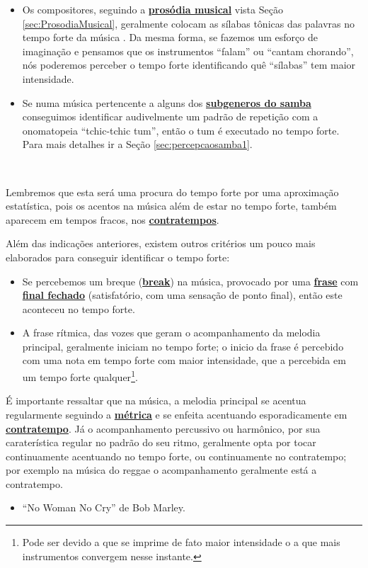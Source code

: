 \begin{itemize}
\item Os compositores, seguindo a \hyperref[sec:ProsodiaMusical]{\textbf{prosódia musical}} vista Seção \ref{sec:ProsodiaMusical}, 
geralmente colocam as sílabas tônicas das palavras no tempo forte da música  \cite[pp. 149]{medteoria}. 
Da mesma forma, se fazemos um esforço de imaginação e pensamos que os instrumentos ``falam'' ou ``cantam chorando'',
nós poderemos perceber o tempo forte identificando quê ``sílabas'' tem maior intensidade.
\item Se numa música pertencente a alguns dos \hyperref[sec:FamiliaSamba]{\textbf{subgeneros do samba}} 
conseguimos identificar audivelmente  um padrão de repetição com a onomatopeia ``tchic-tchic tum'', 
então o tum é executado no tempo forte. 
Para mais detalhes ir a Seção \ref{sec:percepcaosamba1}.
\end{itemize}~

Lembremos que esta será uma procura do tempo forte por uma aproximação estatística, 
pois os acentos na música além de estar no tempo forte, 
também aparecem em tempos fracos, nos \hyperref[sec:contratempo]{\textbf{contratempos}}.




Além das indicações anteriores, 
existem outros critérios um pouco mais elaborados para conseguir identificar o tempo forte:
\begin{itemize}
\item Se percebemos um breque (\hyperref[def:breakingoff]{\textbf{break}}) na música, 
provocado por uma \hyperref[sec:Frase]{\textbf{frase}} com \hyperref[subsec:FinalAbertoFechado]{\textbf{final fechado}} 
(satisfatório, com uma sensação de ponto final), então este aconteceu no tempo forte.
\item A frase rítmica, das vozes que geram o acompanhamento da melodia principal,
geralmente iniciam no tempo forte; 
o inicio da frase é percebido com uma nota em tempo forte com maior intensidade, 
que a percebida em um tempo forte qualquer\footnote{Pode ser
devido a que se imprime de fato maior intensidade o a que mais instrumentos convergem nesse instante.}.
\end{itemize}

\begin{tcbattention}
É importante ressaltar que na música, 
a melodia principal se acentua regularmente seguindo a \hyperref[def:acentometrico]{\textbf{métrica}}
e se enfeita acentuando esporadicamente em \hyperref[sec:contratempo]{\textbf{contratempo}}.
Já o acompanhamento percussivo ou harmônico, por sua caraterística regular no padrão do seu ritmo,
geralmente opta por tocar continuamente acentuando no tempo forte,
ou continuamente no contratempo; 
por exemplo na música do reggae o acompanhamento geralmente está a contratempo.
\begin{itemize}
\item ``No Woman No Cry'' de Bob Marley.
\end{itemize}
\end{tcbattention}



